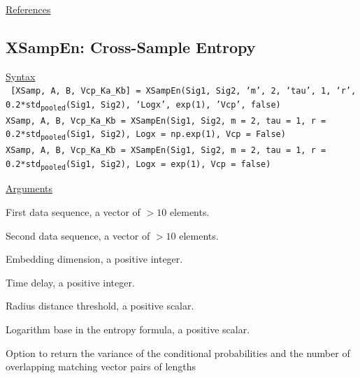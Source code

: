 \documentclass[12pt, a4paper, titlepage, openany]{book}
\begin{document}
\noindent \ul{References}\hspace{1cm}
\cite{Ap1}



\newpage
\subsection{\normalsize XSampEn: \hspace{15mm} Cross-Sample Entropy}\label{XSampEn}
\noindent\ul{Syntax} \vspace{6mm} \\ \noindent \texttt{\footnotesize
[XSamp, A, B, Vcp\_Ka\_Kb] = XSampEn(Sig1, Sig2, ‘m’, 2, ‘tau’, 1, ‘r’, 0.2*std\textsubscript{pooled}(Sig1, Sig2), ‘Logx’, exp(1), 'Vcp', false)\\
 XSamp, A, B, Vcp\_Ka\_Kb  = XSampEn(Sig1, Sig2, m = 2, tau = 1, r = 0.2*std\textsubscript{pooled}(Sig1, Sig2), Logx = np.exp(1), Vcp = False)\\
 XSamp, A, B, Vcp\_Ka\_Kb  = XSampEn(Sig1, Sig2, m = 2, tau = 1, r = 0.2*std\textsubscript{pooled}(Sig1, Sig2), Logx = exp(1), Vcp = false)}

\noindent \ul{Arguments}
\begin{description}[labelsep=1cm, labelwidth=2cm, nosep,,style=multiline,leftmargin=3cm]\footnotesize
\item[\texttt{Sig1}]	First data sequence, a vector of $>10$ elements.
\item[\texttt{Sig2}]	Second data sequence, a vector of $>10$ elements.
\item[\texttt{m}]		Embedding dimension, a positive integer.
\item[\texttt{tau}]		Time delay, a positive integer.
\item[\texttt{r}]		Radius distance threshold, a positive scalar.
\item[\texttt{Logx}]	Logarithm base in the entropy formula, a positive scalar.
\item[\texttt{Vcp}]		Option to return the variance of the conditional probabilities and the number of overlapping matching vector pairs of lengths
\end{description}
\end{document}
